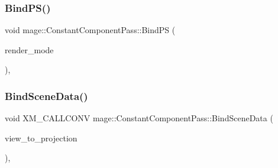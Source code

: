 \hypertarget{classmage_1_1_constant_component_pass_ac8ecc634c666b61931150e6f0b6805d5}{}\label{classmage_1_1_constant_component_pass_ac8ecc634c666b61931150e6f0b6805d5} 
\subsubsection{\texorpdfstring{Bind\+P\+S()}{BindPS()}}
{\footnotesize\ttfamily void mage\+::\+Constant\+Component\+Pass\+::\+Bind\+PS (\begin{DoxyParamCaption}\item[{\hyperlink{namespacemage_a5e7e18b0154373ce8fc942fe3f6b27fd}{Render\+Mode}}]{render\+\_\+mode }\end{DoxyParamCaption})\hspace{0.3cm}{\ttfamily [private]}, {\ttfamily [noexcept]}}

\hypertarget{classmage_1_1_constant_component_pass_a6342dc3563ffabadfd47d818a465cf18}{}\label{classmage_1_1_constant_component_pass_a6342dc3563ffabadfd47d818a465cf18} 
\subsubsection{\texorpdfstring{Bind\+Scene\+Data()}{BindSceneData()}}
{\footnotesize\ttfamily void X\+M\+\_\+\+C\+A\+L\+L\+C\+O\+NV mage\+::\+Constant\+Component\+Pass\+::\+Bind\+Scene\+Data (\begin{DoxyParamCaption}\item[{F\+X\+M\+M\+A\+T\+R\+IX}]{view\+\_\+to\+\_\+projection }\end{DoxyParamCaption})\hspace{0.3cm}{\ttfamily [private]}, {\ttfamily [noexcept]}}

\hypertarget{classmage_1_1_constant_component_pass_a513b83527fdb17a760032b76f3c17012}{}\label{classmage_1_1_constant_component_pass_a513b83527fdb17a760032b76f3c17012} 
